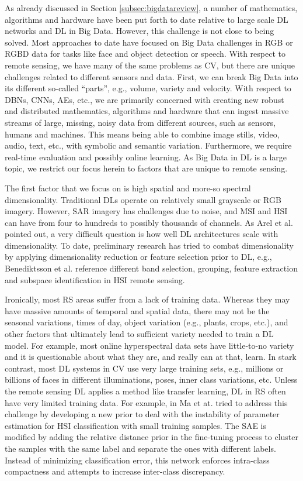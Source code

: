 \documentclass[12pt]{spieman}
\begin{document}
\begin{spacing}{1}
As already discussed in Section \ref{subsec:bigdatareview}, a number of mathematics, algorithms and hardware have been put forth to date relative to large scale DL networks and DL in Big Data. However, this challenge is not close to being solved. Most approaches to date have focused on Big Data challenges in RGB or RGBD data for tasks like face and object detection or speech. With respect to remote sensing, we have many of the same problems as CV, but there are unique challenges related to different sensors and data. First, we can break Big Data into its different so-called ``parts'', e.g., volume, variety and velocity. With respect to DBNs, CNNs, AEs, etc., we are primarily concerned with creating new robust and distributed mathematics, algorithms and hardware that can ingest massive streams of large, missing, noisy data from different sources, such as sensors, humans and machines. This means being able to combine image stills, video, audio, text, etc., with symbolic and semantic variation. Furthermore, we require real-time evaluation and possibly online learning. As Big Data in DL is a large topic, we restrict our focus herein to factors that are unique to remote sensing.

The first factor that we focus on is high spatial and more-so spectral dimensionality. Traditional DLs operate on relatively small grayscale or RGB imagery. However, SAR imagery has challenges due to noise, and MSI and HSI can have from four to hundreds to possibly thousands of channels. As Arel et al. \cite{Arel2010} pointed out, a very difficult question is how well DL architectures scale with dimensionality. To date, preliminary research has tried to combat dimensionality by applying dimensionality reduction or feature selection prior to DL, e.g., Benediktsson et al. \cite{Benediktsson2012} reference different band selection, grouping, feature extraction and subspace identification in HSI remote sensing.

Ironically, most RS areas suffer from a lack of training data. Whereas they may have massive amounts of temporal and spatial data, there may not be the seasonal variations, times of day, object variation (e.g., plants, crops, etc.), and other factors that ultimately lead to sufficient variety needed to train a DL model. For example, most online hyperspectral data sets have little-to-no variety and it is questionable about what they are, and really can at that, learn. In stark contrast, most DL systems in CV use very large training sets, e.g., millions or billions of faces in different illuminations, poses, inner class variations, etc. Unless the remote sensing DL applies a method like transfer learning, DL in RS often have very limited training data. For example, in \cite{ma2016hyperspectral} Ma et at. tried to address this challenge by developing a new prior to deal with the instability of parameter estimation for HSI classification with small training samples. The SAE is modified by adding the relative distance prior in the fine-tuning process to cluster the samples with the same label and separate the ones with different labels. Instead of minimizing classification error, this network enforces intra-class compactness and attempts to increase inter-class discrepancy.


\end{spacing}
\end{document}

